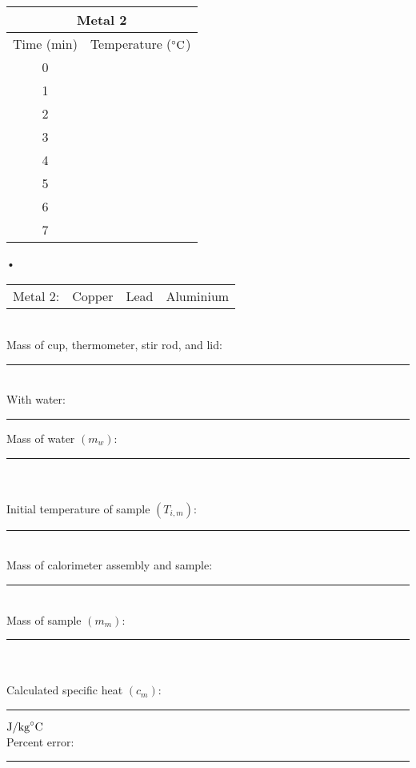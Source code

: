 \documentclass[main.tex]{subfiles}
\begin{document}
\begin{onehalfspace}
\begin{wraptable}{r}{0.25\textwidth}
\begin{tabular}{|c|c|}
\hline
\multicolumn{2}{|c|}{Metal 2}\\
\hline
Time (min) & Temperature ($\celsius$)\\
\hline
0 & \\
\hline
1 & \\
\hline
2 & \\
\hline
3 & \\
\hline
4 & \\
\hline
5 & \\
\hline
6 & \\
\hline
7 & \\
\hline
\end{tabular}•
\end{wraptable}
\begin{tabular}{cccc}
Metal 2: & Copper & Lead & Aluminium
\end{tabular}\\
Mass of cup, thermometer, stir rod, and lid:\rule[-1mm]{2cm}{.1pt}\\
With water:\rule[-1mm]{2cm}{.1pt} Mass of water $(m_w)$:\rule[-1mm]{1.7cm}{.1pt}\\ \\
Initial temperature of sample $(T_{i,m})$:\rule[-1mm]{2cm}{.1pt}\\
Mass of calorimeter assembly and sample:\rule[-1mm]{2cm}{.1pt}\\
Mass of sample $(m_m)$:\rule[-1mm]{2cm}{.1pt}\\ \\
Calculated specific heat $(c_m)$:\rule[-1mm]{2cm}{.1pt} $\text{J}/\text{kg}\celsius$\\
Percent error:\rule[-1mm]{2cm}{.1pt}\\

\end{onehalfspace}
\end{document}
